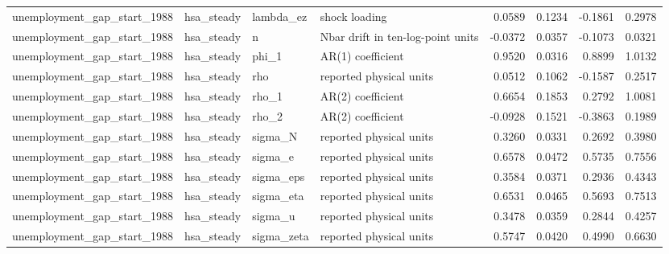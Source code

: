 \begin{tabular}{llllrrrr}
unemployment\_gap\_start\_1988 & hsa\_steady & lambda\_ez & shock loading & 0.0589 & 0.1234 & -0.1861 & 0.2978 \\
unemployment\_gap\_start\_1988 & hsa\_steady & n & Nbar drift in ten-log-point units & -0.0372 & 0.0357 & -0.1073 & 0.0321 \\
unemployment\_gap\_start\_1988 & hsa\_steady & phi\_1 & AR(1) coefficient & 0.9520 & 0.0316 & 0.8899 & 1.0132 \\
unemployment\_gap\_start\_1988 & hsa\_steady & rho & reported physical units & 0.0512 & 0.1062 & -0.1587 & 0.2517 \\
unemployment\_gap\_start\_1988 & hsa\_steady & rho\_1 & AR(2) coefficient & 0.6654 & 0.1853 & 0.2792 & 1.0081 \\
unemployment\_gap\_start\_1988 & hsa\_steady & rho\_2 & AR(2) coefficient & -0.0928 & 0.1521 & -0.3863 & 0.1989 \\
unemployment\_gap\_start\_1988 & hsa\_steady & sigma\_N & reported physical units & 0.3260 & 0.0331 & 0.2692 & 0.3980 \\
unemployment\_gap\_start\_1988 & hsa\_steady & sigma\_e & reported physical units & 0.6578 & 0.0472 & 0.5735 & 0.7556 \\
unemployment\_gap\_start\_1988 & hsa\_steady & sigma\_eps & reported physical units & 0.3584 & 0.0371 & 0.2936 & 0.4343 \\
unemployment\_gap\_start\_1988 & hsa\_steady & sigma\_eta & reported physical units & 0.6531 & 0.0465 & 0.5693 & 0.7513 \\
unemployment\_gap\_start\_1988 & hsa\_steady & sigma\_u & reported physical units & 0.3478 & 0.0359 & 0.2844 & 0.4257 \\
unemployment\_gap\_start\_1988 & hsa\_steady & sigma\_zeta & reported physical units & 0.5747 & 0.0420 & 0.4990 & 0.6630 \\
\bottomrule
\end{tabular}
